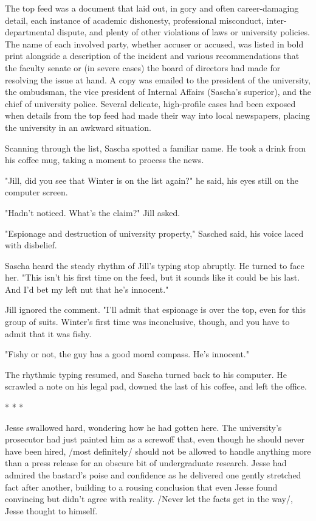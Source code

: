 The top feed was a document that laid out, in gory and often career-damaging detail, each instance of academic dishonesty, professional misconduct, inter-departmental dispute, and plenty of other violations of laws or university policies.  The name of each involved party, whether accuser or accused, was listed in bold print alongside a description of the incident and various recommendations that the faculty senate or (in severe cases) the board of directors had made for resolving the issue at hand.  A copy was emailed to the president of the university, the ombudsman, the vice president of Internal Affairs (Sascha's superior), and the chief of university police.  Several delicate, high-profile cases had been exposed when details from the top feed had made their way into local newspapers, placing the university in an awkward situation.

Scanning through the list, Sascha spotted a familiar name.  He took a drink from his coffee mug, taking a moment to process the news.

"Jill, did you see that Winter is on the list again?" he said, his eyes still on the computer screen.

"Hadn't noticed.  What's the claim?" Jill asked.

"Espionage and destruction of university property," Sasched said, his voice laced with disbelief.

Sascha heard the steady rhythm of Jill's typing stop abruptly.  He turned to face her.  "This isn't his first time on the feed, but it sounds like it could be his last.  And I'd bet my left nut that he's innocent."

Jill ignored the comment.  "I'll admit that espionage is over the top, even for this group of suits.  Winter's first time was inconclusive, though, and you have to admit that it was fishy.

"Fishy or not, the guy has a good moral compass.  He's innocent."

The rhythmic typing resumed, and Sascha turned back to his computer.  He scrawled a note on his legal pad, downed the last of his coffee, and left the office.

								* * *
								
Jesse swallowed hard, wondering how he had gotten here.  The university's prosecutor had just painted him as a screwoff that, even though he should never have been hired, /most definitely/ should not be allowed to handle anything more than a press release for an obscure bit of undergraduate research.  Jesse had admired the bastard's poise and confidence as he delivered one gently stretched fact after another, building to a rousing conclusion that even Jesse found convincing but didn't agree with reality.  /Never let the facts get in the way/, Jesse thought to himself.


